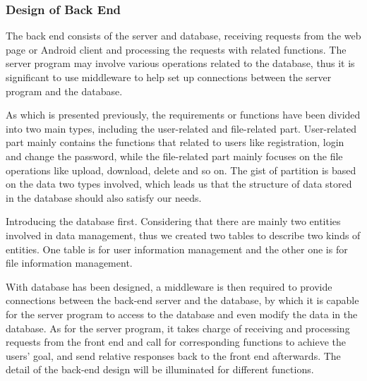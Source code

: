 \documentclass[a4paper,11pt]{article}
\begin{document}
\subsubsection{Design of Back End}
\par The back end consists of the server and database, receiving requests from the web page or Android client and processing the requests with related functions. The server program may involve various operations related to the database, thus it is significant to use middleware to help set up connections between the server program and the database. 
\par As which is presented previously, the requirements or functions have been divided into two main types, including the user-related and file-related part. User-related part mainly contains the functions that related to users like registration, login and change the password, while the file-related part mainly focuses on the file operations like upload, download, delete and so on. The gist of partition is based on the data two types involved, which leads us that the structure of data stored in the database should also satisfy our needs.
\par Introducing the database first. Considering that there are mainly two entities involved in data management, thus we created two tables to describe two kinds of entities. One table is for user information management and the other one is for file information management. 
\par With database has been designed, a middleware is then required to provide connections between the back-end server and the database, by which it is capable for the server program to access to the database and even modify the data in the database. As for the server program, it takes charge of receiving and processing requests from the front end and call for corresponding functions to achieve the users’ goal, and send relative responses back to the front end afterwards. The detail of the back-end design will be illuminated for different functions.
\end{document}
